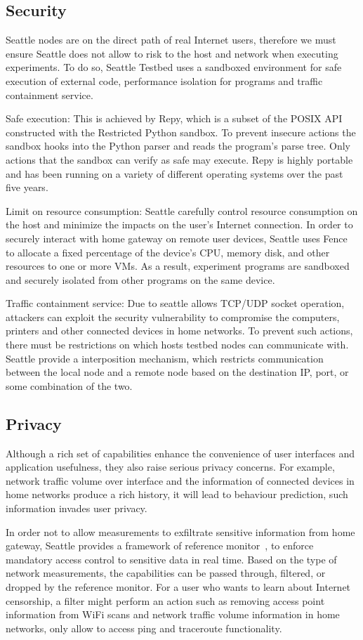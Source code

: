 \subsection{Security}
Seattle nodes are on the direct path of real Internet users, therefore we 
must ensure Seattle does not allow to risk to the host and network when 
executing experiments. To do so, Seattle Testbed uses a sandboxed 
environment for safe execution of external code, performance isolation for 
programs and traffic containment service. 

Safe execution: This is achieved by Repy, which is a subset of the POSIX API 
constructed with the Restricted Python sandbox. To prevent insecure actions 
the sandbox hooks into the Python parser and reads the program's parse tree. 
Only actions that the sandbox can verify as safe may execute. Repy is highly 
portable and has been running on a variety of different operating systems 
over the past five years.

Limit on resource consumption: Seattle carefully control resource 
consumption on the host and minimize the impacts on the user's Internet 
connection. In order to securely interact with home gateway on remote user 
devices, Seattle uses Fence~\cite{li2015fence} to allocate a fixed 
percentage of the device's CPU, memory disk, and other resources to one or 
more VMs. As a result, experiment programs are sandboxed and securely 
isolated from other programs on the same device. 

Traffic containment service: Due to seattle allows TCP/UDP socket operation, 
attackers can exploit the security vulnerability to compromise the 
computers, printers and other connected devices in home networks. To prevent 
such actions, there must be restrictions on which hosts testbed nodes can 
communicate with. Seattle provide a interposition mechanism, which restricts 
communication between the local node and a remote node based on the 
destination IP, port, or some combination of the two. 

\subsection{Privacy}
Although a rich set of capabilities enhance the convenience of user 
interfaces and application usefulness, they also raise serious privacy 
concerns. For example, network traffic volume over interface and the 
information of connected devices in home networks produce a rich history, it 
will lead to behaviour prediction, such information invades user privacy. 

In order not to allow measurements to exfiltrate sensitive information from 
home gateway, Seattle provides a framework of reference monitor~\cite{ref}, 
to enforce mandatory access control to sensitive data in real time. Based on 
the type of network measurements, the capabilities can be passed through, 
filtered, or dropped by the reference monitor. For a user who wants to learn 
about Internet censorship, a filter might perform an action such as removing 
access point information from WiFi scans and network traffic volume 
information in home networks, only allow to access ping and traceroute 
functionality.